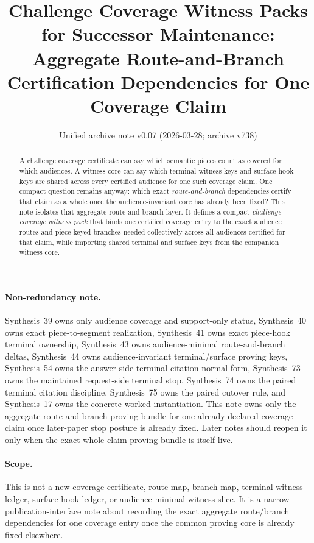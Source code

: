 \documentclass[11pt]{article}
\title{Challenge Coverage Witness Packs for Successor Maintenance:\\[0.5ex]
\large Aggregate Route-and-Branch Certification Dependencies for One Coverage Claim}
\author{}
\date{Unified archive note v0.07 (2026-03-28; archive v738)}
\begin{document}
\maketitle

\begin{abstract}
A challenge coverage certificate can say which semantic pieces count as covered for which audiences.
A witness core can say which terminal-witness keys and surface-hook keys are shared across every certified audience for one such coverage claim.
One compact question remains anyway: which exact \emph{route-and-branch} dependencies certify that claim as a whole once the audience-invariant core has already been fixed?
This note isolates that aggregate route-and-branch layer.
It defines a compact \emph{challenge coverage witness pack} that binds one certified coverage entry to the exact audience routes and piece-keyed branches needed collectively across all audiences certified for that claim, while importing shared terminal and surface keys from the companion witness core.
\end{abstract}

\paragraph{Non-redundancy note.}
Synthesis~39 owns only audience coverage and support-only status, Synthesis~40 owns exact piece-to-segment realization, Synthesis~41 owns exact piece-hook terminal ownership, Synthesis~43 owns audience-minimal route-and-branch deltas, Synthesis~44 owns audience-invariant terminal/surface proving keys, Synthesis~54 owns the answer-side terminal citation normal form, Synthesis~73 owns the maintained request-side terminal stop, Synthesis~74 owns the paired terminal citation discipline, Synthesis~75 owns the paired cutover rule, and Synthesis~17 owns the concrete worked instantiation.
This note owns only the aggregate route-and-branch proving bundle for one already-declared coverage claim once later-paper stop posture is already fixed. Later notes should reopen it only when the exact whole-claim proving bundle is itself live.
\paragraph{Scope.}
This is not a new coverage certificate, route map, branch map, terminal-witness ledger, surface-hook ledger, or audience-minimal witness slice.
It is a narrow publication-interface note about recording the exact aggregate route/branch dependencies for one coverage entry once the common proving core is already fixed elsewhere.
\end{document}
